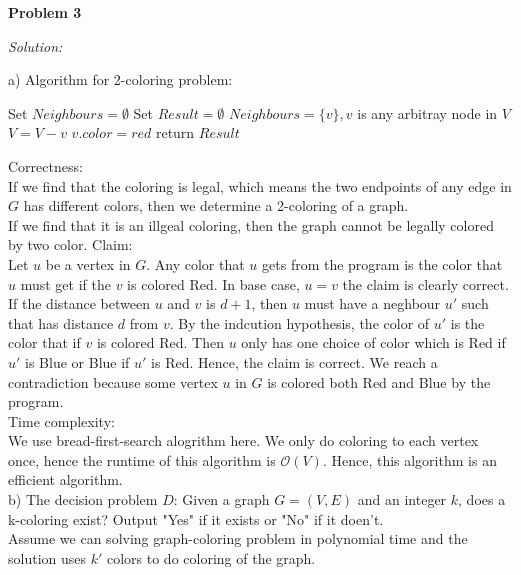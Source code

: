 \documentclass[12pt,letterpaper]{article}
\def\pp{\par\noindent}
\newcommand{\problem}[1]{ \bigskip \pp \textbf{Problem #1}\par}
\newcommand{\solution}{\textit{Solution:}\par}
\begin{document}
\problem{3}
\solution
a) Algorithm for 2-coloring problem: \\
\begin{algorithm}[H]
Set $Neighbours = \emptyset$ \;
Set $Result = \emptyset$ \;
$Neighbours = \{ v \}, v$ is any arbitray node in $V$\;
$V = V- v$ \;
$v.color = red$ \;
return $Result$ \;
\end{algorithm}
Correctness: \\
If we find that the coloring is legal,
which means the two endpoints of any edge in $G$ has different colors,
then we determine a 2-coloring of a graph. \\
If we find that it is an illgeal coloring, then the graph cannot be legally colored by two color.
Claim: \\
Let $u$ be a vertex in $G$.
Any color that $u$ gets from the program is the color that $u$ must get if the $v$ is colored Red.
In base case, $u = v$ the claim is clearly correct.
If the distance between $u$ and $v$ is $d+1$, then $u$ must have a neghbour $u'$ such that has distance $d$ from $v$.
By the indcution hypothesis, the color of $u'$ is the color that if $v$ is colored Red.
Then $u$ only has one choice of color which is Red if $u'$ is Blue or Blue if $u'$ is Red.
Hence, the claim is correct.
We reach a contradiction because some vertex $u$ in $G$ is colored both Red and Blue by the program. \\
Time complexity: \\
We use bread-first-search alogrithm here.
We only do coloring to each vertex once, hence the runtime of this algorithm is $\mathcal{O}(V)$.
Hence, this algorithm is an efficient algorithm. \\
b) The decision problem $D$: Given a graph $G=(V,E)$ and an integer $k$, does a k-coloring exist? Output "Yes" if it exists or "No" if it doen't. \\
Assume we can solving graph-coloring problem in polynomial time and the solution uses $k'$ colors to do coloring of the graph.
\end{document}
